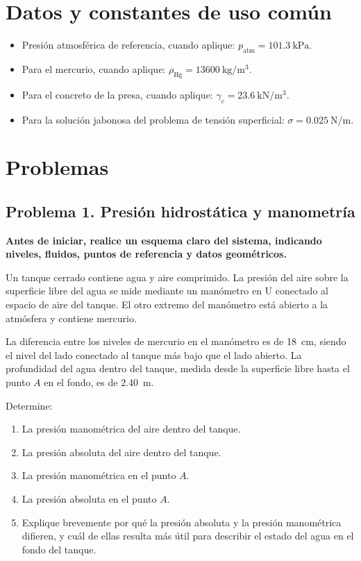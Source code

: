 \documentclass[11pt]{article}
\begin{document}
\section{Datos y constantes de uso común}
\begin{itemize}
\item Presión atmosférica de referencia, cuando aplique: $p_{\text{atm}} = \SI{101.3}{\kilo\pascal}$.
\item Para el mercurio, cuando aplique: $\rho_{\text{Hg}} = \SI{13600}{\kilogram\per\meter\cubed}$.
\item Para el concreto de la presa, cuando aplique: $\gamma_c = \SI{23.6}{\kilo\newton\per\meter\cubed}$.
\item Para la solución jabonosa del problema de tensión superficial: $\sigma = \SI{0.025}{\newton\per\meter}$.
\end{itemize}

\section{Problemas}

\subsection*{Problema 1. Presión hidrostática y manometría}
\textbf{Antes de iniciar, realice un esquema claro del sistema, indicando niveles, fluidos, puntos de referencia y datos geométricos.}

Un tanque cerrado contiene agua y aire comprimido. La presión del aire sobre la superficie libre del agua se mide mediante un manómetro en U conectado al espacio de aire del tanque. El otro extremo del manómetro está abierto a la atmósfera y contiene mercurio.

La diferencia entre los niveles de mercurio en el manómetro es de \SI{18}{\centi\meter}, siendo el nivel del lado conectado al tanque más bajo que el lado abierto. La profundidad del agua dentro del tanque, medida desde la superficie libre hasta el punto $A$ en el fondo, es de \SI{2.40}{\meter}.

Determine:
\begin{enumerate}
\item La presión manométrica del aire dentro del tanque.
\item La presión absoluta del aire dentro del tanque.
\item La presión manométrica en el punto $A$.
\item La presión absoluta en el punto $A$.
\item Explique brevemente por qué la presión absoluta y la presión manométrica difieren, y cuál de ellas resulta más útil para describir el estado del agua en el fondo del tanque.
\end{enumerate}
\end{document}
